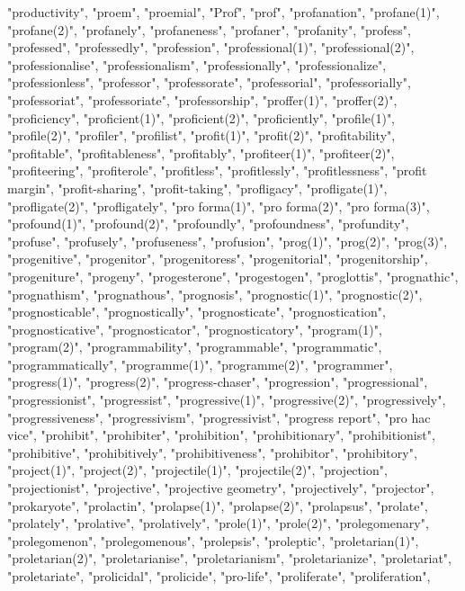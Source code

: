"productivity",
"proem",
"proemial",
"Prof",
"prof",
"profanation",
"profane(1)",
"profane(2)",
"profanely",
"profaneness",
"profaner",
"profanity",
"profess",
"professed",
"professedly",
"profession",
"professional(1)",
"professional(2)",
"professionalise",
"professionalism",
"professionally",
"professionalize",
"professionless",
"professor",
"professorate",
"professorial",
"professorially",
"professoriat",
"professoriate",
"professorship",
"proffer(1)",
"proffer(2)",
"proficiency",
"proficient(1)",
"proficient(2)",
"proficiently",
"profile(1)",
"profile(2)",
"profiler",
"profilist",
"profit(1)",
"profit(2)",
"profitability",
"profitable",
"profitableness",
"profitably",
"profiteer(1)",
"profiteer(2)",
"profiteering",
"profiterole",
"profitless",
"profitlessly",
"profitlessness",
"profit margin",
"profit-sharing",
"profit-taking",
"profligacy",
"profligate(1)",
"profligate(2)",
"profligately",
"pro forma(1)",
"pro forma(2)",
"pro forma(3)",
"profound(1)",
"profound(2)",
"profoundly",
"profoundness",
"profundity",
"profuse",
"profusely",
"profuseness",
"profusion",
"prog(1)",
"prog(2)",
"prog(3)",
"progenitive",
"progenitor",
"progenitoress",
"progenitorial",
"progenitorship",
"progeniture",
"progeny",
"progesterone",
"progestogen",
"proglottis",
"prognathic",
"prognathism",
"prognathous",
"prognosis",
"prognostic(1)",
"prognostic(2)",
"prognosticable",
"prognostically",
"prognosticate",
"prognostication",
"prognosticative",
"prognosticator",
"prognosticatory",
"program(1)",
"program(2)",
"programmability",
"programmable",
"programmatic",
"programmatically",
"programme(1)",
"programme(2)",
"programmer",
"progress(1)",
"progress(2)",
"progress-chaser",
"progression",
"progressional",
"progressionist",
"progressist",
"progressive(1)",
"progressive(2)",
"progressively",
"progressiveness",
"progressivism",
"progressivist",
"progress report",
"pro hac vice",
"prohibit",
"prohibiter",
"prohibition",
"prohibitionary",
"prohibitionist",
"prohibitive",
"prohibitively",
"prohibitiveness",
"prohibitor",
"prohibitory",
"project(1)",
"project(2)",
"projectile(1)",
"projectile(2)",
"projection",
"projectionist",
"projective",
"projective geometry",
"projectively",
"projector",
"prokaryote",
"prolactin",
"prolapse(1)",
"prolapse(2)",
"prolapsus",
"prolate",
"prolately",
"prolative",
"prolatively",
"prole(1)",
"prole(2)",
"prolegomenary",
"prolegomenon",
"prolegomenous",
"prolepsis",
"proleptic",
"proletarian(1)",
"proletarian(2)",
"proletarianise",
"proletarianism",
"proletarianize",
"proletariat",
"proletariate",
"prolicidal",
"prolicide",
"pro-life",
"proliferate",
"proliferation",
